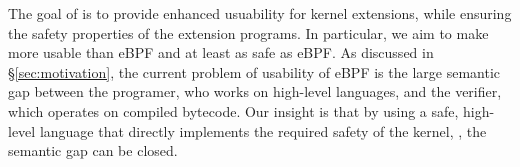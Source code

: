 
%


The goal of \projname{} is to provide enhanced usuability for kernel extensions,
    while ensuring the safety properties of the extension programs.
In particular, we aim to make \projname{} more usable than eBPF and at least
    as safe as eBPF.
As discussed in \S\ref{sec:motivation}, the current problem of usability of
    eBPF is the large semantic gap between the programer, who works on
    high-level languages, and the verifier, which operates on compiled bytecode.
Our insight is that by using a safe, high-level language that directly
    implements the required safety of the kernel, , the semantic gap can be
    closed.

